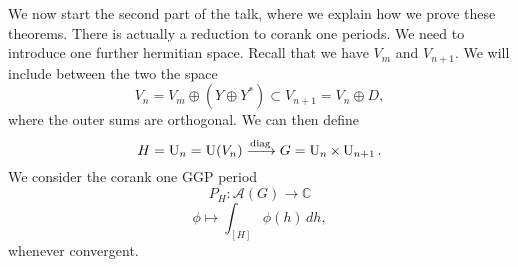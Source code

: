 \documentclass[reqno]{amsart} 
\begin{document}
We now start the second part of the talk, where we explain how we prove these theorems.  There is actually a reduction to corank one periods.  We need to introduce one further hermitian space.  Recall that we have $V_m$ and $V_{n + 1}$.  We will include between the two the space
\begin{equation*}
V_n = V_m \oplus (Y \oplus Y^\ast ) \subset V_{n + 1} = V_n \oplus D,
\end{equation*}
where the outer sums are orthogonal.  We can then define
\begin{equation*}
H = \operatorname{U}_n = \operatorname{U} (V_n ) \xrightarrow{\mathrm{diag}} G = \operatorname{U}_n \times \operatorname{U}_{n + 1}.
\end{equation*}
We consider the corank one GGP period
\begin{equation*}
P_H : \mathcal{A} (G) \rightarrow \mathbb{C}
\end{equation*}
\begin{equation*}
\phi \mapsto \int_{[H]} \phi (h) \, d h,
\end{equation*}
whenever convergent.
\end{document}
